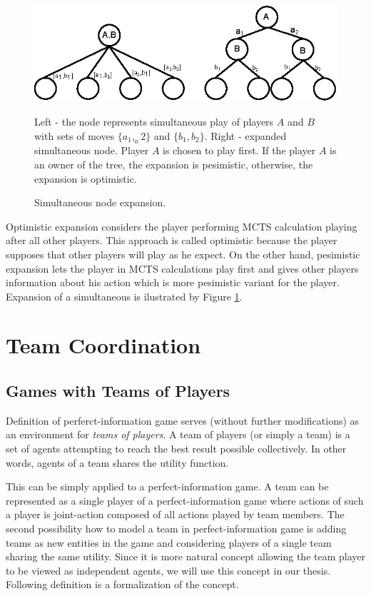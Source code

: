 \begin{figure}
\begin{center}
\includegraphics[width=12cm]{img/simultaneous_node_expansion.eps}
\end{center}
\caption{\footnotesize Simultaneous node expansion.}{\footnotesize Left - the node represents
simultaneous play of players $A$ and $B$ with sets of moves $\{a_1,_a2\}$ and $\{b_1,b_2\}$.
Right - expanded simultaneous node. Player $A$ is chosen to play first. If the player $A$ is an
owner of the tree, the expansion is pesimistic, otherwise, the expansion is optimistic.}
\label{fig_simultaneous_node_expansion}
\end{figure}

Optimistic expansion considers the
player performing MCTS calculation playing after all other players. This approach is called
optimistic because the player supposes that other players will play as he expect. On the other hand,
pesimistic expansion lets the player in MCTS calculations play first and gives other players
information about his action which is more pesimistic variant for the player. Expansion of
a simultaneous is ilustrated by Figure \ref{fig_simultaneous_node_expansion}.



\section{Team Coordination}

\subsection{Games with Teams of Players}
\label{sec_games_with_teams}

Definition of perferct-information game serves (without further modifications) as an
environment for \emph{teams of players}. A team of players (or simply a team) is a set of agents
attempting to reach the best result possible collectively. In other words, agents of a team
shares the utility function. 

This can be simply applied to a perfect-information game. A team can be represented as a single
player of a perfect-information game where actions of such a player is joint-action composed of
all actions played by team members. The second possibility how to model a team in
perfect-information game is adding teams as new entities in the game and considering players of
a single team sharing the same utility. Since it is more natural concept allowing the team 
player to be viewed as
independent agents, we will use this concept in our thesis. Following definition is a
formalization of the concept.



